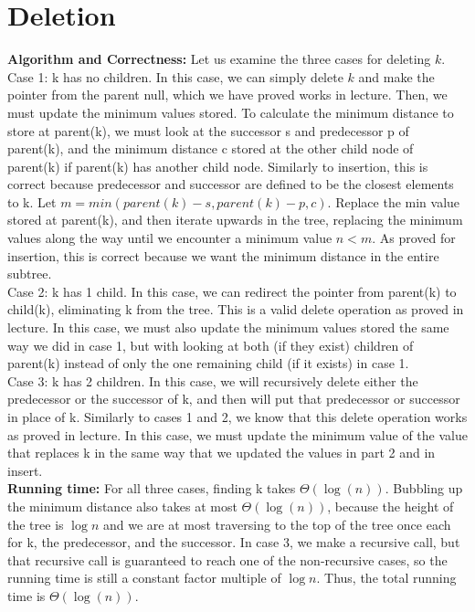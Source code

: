 \documentclass[12pt]{article}
\begin{document}
\section*{Deletion}
\textbf{Algorithm and Correctness:} Let us examine the three cases for deleting $k$.\\
Case 1: k has no children. In this case, we can simply delete $k$ and make the pointer from the parent null, which we have proved works in lecture. Then, we must update the minimum values stored. To calculate the minimum distance to store at parent(k), we must look at the successor s and predecessor p of parent(k), and the minimum distance c stored at the other child node of parent(k) if parent(k) has another child node. Similarly to insertion, this is correct because predecessor and successor are defined to be the closest elements to k. Let $m = min(parent(k) - s, parent(k) - p, c)$. Replace the min value stored at parent(k), and then iterate upwards in the tree, replacing the minimum values along the way until we encounter a minimum value $n < m$. As proved for insertion, this is correct because we want the minimum distance in the entire subtree.\\
Case 2: k has 1 child. In this case, we can redirect the pointer from parent(k) to child(k), eliminating k from the tree. This is a valid delete operation as proved in lecture. In this case, we must also update the minimum values stored the same way we did in case 1, but with looking at both (if they exist) children of parent(k) instead of only the one remaining child (if it exists) in case 1.\\
Case 3: k has 2 children. In this case, we will recursively delete either the predecessor or the successor of k, and then will put that predecessor or successor in place of k. Similarly to cases 1 and 2, we know that this delete operation works as proved in lecture. In this case, we must update the minimum value of the value that replaces k in the same way that we updated the values in part 2 and in insert.\\
\textbf{Running time:} For all three cases, finding k takes $\Theta(\log(n))$. Bubbling up the minimum distance also takes at most $\Theta(\log(n))$, because the height of the tree is $\log n$ and we are at most traversing to the top of the tree once each for k, the predecessor, and the successor. In case 3, we make a recursive call, but that recursive call is guaranteed to reach one of the non-recursive cases, so the running time is still a constant factor multiple of $\log n$. Thus, the total running time is $\Theta(\log(n))$.\\
\end{document}
